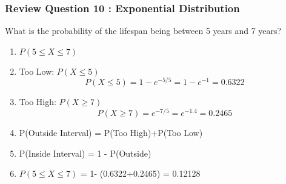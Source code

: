 \documentclass[a4]{beamer}
\begin{document}
\begin{frame}
\frametitle{Review Question 10 :  Exponential Distribution}
What is the probability of the lifespan being between 5 years and 7 years?
    \begin{enumerate}
    \item $P(5 \leq X \leq 7)$
    \item Too Low: $P(X \leq 5)$
    \[P(X \leq 5) = 1- e^{-5/5} = 1-e^{-1} = 0.6322 \]
    \item Too High: $P(X \geq 7)$
    \[P(X \geq 7) = e^{-7/5} = e^{-1.4} = 0.2465 \]
    \item P(Outside Interval) = P(Too High)+P(Too Low)
    \item P(Inside Interval) = 1 - P(Outside)
    \item $P(5 \leq X \leq 7)$ = 1- (0.6322+0.2465) = 0.12128
    \end{enumerate}
\end{frame}
\end{document}
